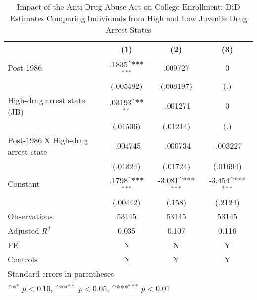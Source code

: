 \begin{table}[htbp]\centering
\def\sym#1{\ifmmode^{#1}\else\(^{#1}\)\fi}
\caption{Impact of the Anti-Drug Abuse Act on College Enrollment: DiD Estimates Comparing Individuals from High and Low Juvenile Drug Arrest States}
\begin{tabular}{l*{3}{c}}
\hline\hline
                    &\multicolumn{1}{c}{(1)}         &\multicolumn{1}{c}{(2)}         &\multicolumn{1}{c}{(3)}         \\
\hline
Post-1986           &       .1835\sym{***}&     .009727         &           0         \\
                    &   (.005482)         &   (.008197)         &         (.)         \\
[1em]
High-drug arrest state (JB)&      .03193\sym{**} &    -.001271         &           0         \\
                    &    (.01506)         &    (.01214)         &         (.)         \\
[1em]
Post-1986 X High-drug arrest state&    -.004745         &    -.000734         &    -.003227         \\
                    &    (.01824)         &    (.01724)         &    (.01694)         \\
[1em]
Constant            &       .1798\sym{***}&      -3.081\sym{***}&      -3.454\sym{***}\\
                    &    (.00442)         &      (.158)         &     (.2124)         \\
\hline
Observations        &       53145         &       53145         &       53145         \\
Adjusted \(R^{2}\)  &       0.035         &       0.107         &       0.116         \\
FE                  &           N         &           N         &           Y         \\
Controls            &           N         &           Y         &           Y         \\
\hline\hline
\multicolumn{4}{l}{\footnotesize Standard errors in parentheses}\\
\multicolumn{4}{l}{\footnotesize \sym{*} \(p<0.10\), \sym{**} \(p<0.05\), \sym{***} \(p<0.01\)}\\
\end{tabular}
\end{table}

